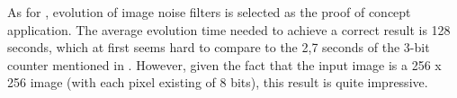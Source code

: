 As for \cite{dpr}, evolution of image noise filters is selected as the proof of concept application. The average evolution time needed to achieve a correct result is 128 seconds, which at first seems hard to compare to the 2,7 seconds of the 3-bit counter mentioned in \cite{virtex4}. However, given the fact that the input image is a 256 x 256 image (with each pixel existing of 8 bits), this result is quite impressive. 
